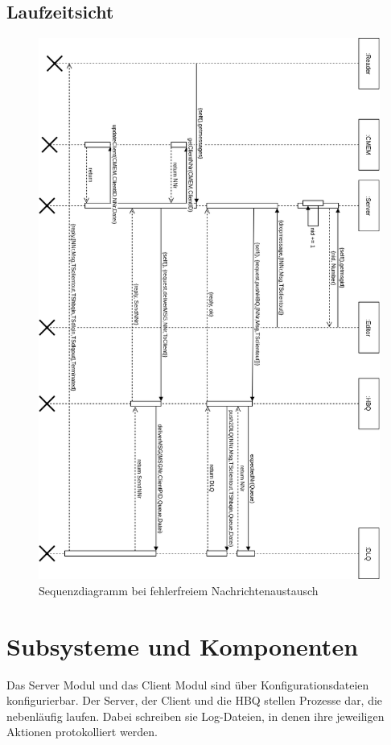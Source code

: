 \documentclass{article}
\begin{document}
\subsection{Laufzeitsicht}
\begin{figure}[H]
\centering
\includegraphics[width=\textwidth]{sequence-diagram.png}
\caption[seq-dia]{Sequenzdiagramm bei fehlerfreiem Nachrichtenaustausch}
\label{fig:sequence-diagram}
\end{figure}

\newpage

\section{Subsysteme und Komponenten}
Das Server Modul und das Client Modul sind über Konfigurationsdateien konfigurierbar. Der Server, der Client und die HBQ
stellen Prozesse dar, die nebenläufig laufen. Dabei schreiben sie Log-Dateien, in denen ihre jeweiligen Aktionen
protokolliert werden.
\end{document}
